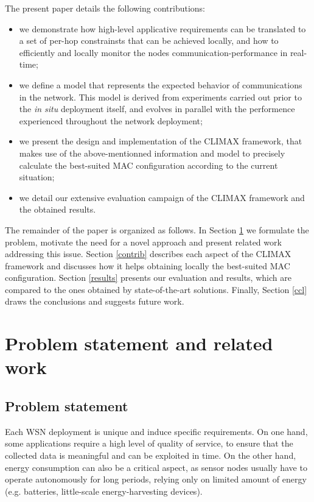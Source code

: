 \documentclass[12pt,journal,compsoc]{IEEEtran}
\begin{document}
The present paper details the following contributions:

\begin{itemize}
	\item we demonstrate how high-level applicative requirements can be translated to a set of per-hop constrainsts that can be achieved locally, and how to efficiently and locally monitor the nodes communication-performance in real-time;
	\item we define a model that represents the expected behavior of communications in the network. This model is derived from experiments carried out prior to the \textit{in situ} deployment itself, and evolves in parallel with the performence experienced throughout the network deployment;
	\item we present the design and implementation of the CLIMAX framework, that makes use of the above-mentionned information and model to precisely calculate the best-suited MAC configuration according to the current situation;
	\item we detail our extensive evaluation campaign of the CLIMAX framework and the obtained results.
\end{itemize}

The remainder of the paper is organized as follows. In Section \ref{RW} we formulate the problem, motivate the need for a novel approach and present related work addressing this issue. Section \ref{contrib} describes each aspect of the CLIMAX framework and discusses how it helps obtaining locally the best-suited MAC configuration. Section \ref{results} presents
our evaluation and results, which are compared to the ones obtained by state-of-the-art solutions. Finally, Section \ref{ccl} draws the conclusions and suggests future work.

\section{Problem statement and related work}
\label{RW}


\subsection{Problem statement}
Each WSN deployment is unique and induce specific requirements. On one hand, some applications require a high level of quality of service, to ensure that the collected data is meaningful and can be exploited in time. On the other hand, energy consumption can also be a critical aspect, as sensor nodes usually have to operate autonomously for long periods, relying only on limited amount of energy (e.g. batteries, little-scale energy-harvesting devices).
\end{document}
